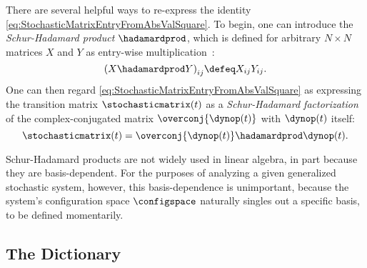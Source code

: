 \documentclass[12pt,english,prl,superscriptaddress,nobibnotes,nofootinbib]{revtex4-2}
\let\originalleft\left
\let\originalright\right
\renewcommand{\left}{\mathopen{}\mathclose\bgroup\originalleft}
\renewcommand{\right}{\aftergroup\egroup\originalright}
\begin{document}
There are several helpful ways to re-express the identity \eqref{eq:StochasticMatrixEntryFromAbsValSquare}.
To begin, one can introduce the \emph{Schur-Hadamard product} $\hadamardprod$,
which is defined for arbitrary $N\times N$ matrices $X$ and $Y$
as entry-wise multiplication~\citep{Schur:1911bztdbbmuvv,Halmos:1958fvs,Horn:1990thp}:
\begin{equation}
\left(X\hadamardprod Y\right)_{ij}\defeq X_{ij}Y_{ij}.\label{eq:DefSchurHadamardProduct}
\end{equation}
 One can then regard \eqref{eq:StochasticMatrixEntryFromAbsValSquare}
as expressing the transition matrix $\stochasticmatrix\left(t\right)$
as a \emph{Schur-Hadamard factorization} of the complex-conjugated
matrix $\overconj{\dynop\left(t\right)}$ with $\dynop\left(t\right)$
itself: 
\begin{equation}
\stochasticmatrix\left(t\right)=\overconj{\dynop\left(t\right)}\hadamardprod\dynop\left(t\right).\label{eq:StochasticMatrixSchurHadamardFactorization}
\end{equation}

Schur-Hadamard products are not widely used in linear algebra, in
part because they are basis-dependent. For the purposes of analyzing
a given generalized stochastic system, however, this basis-dependence
is unimportant, because the system's configuration space $\configspace$
naturally singles out a specific basis, to be defined momentarily.

\subsection{The Dictionary\label{subsec:The-Dictionary}}
\end{document}
